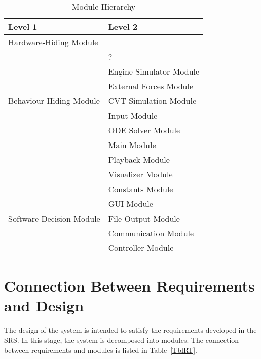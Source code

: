 \documentclass[12pt, titlepage]{article}
\begin{document}
\begin{table}[h!]
\centering
\begin{tabular}{p{} p{}}
\toprule
\textbf{Level 1} & \textbf{Level 2}\\
\midrule

{Hardware-Hiding Module} & ~ \\
\midrule

\multirow{7}{0.3\textwidth}{Behaviour-Hiding Module} & ?\\
& Engine Simulator Module\\
& External Forces Module\\
& CVT Simulation Module\\
& Input Module\\
& ODE Solver Module\\
& Main Module\\ 
& Playback Module\\
& Visualizer Module\\
& Constants Module\\
\midrule

\multirow{3}{0.3\textwidth}{Software Decision Module}
& GUI Module\\
& File Output Module\\
& Communication Module\\
& Controller Module\\
\bottomrule

\end{tabular}
\caption{Module Hierarchy}
\label{TblMH}
\end{table}

\section{Connection Between Requirements and Design} \label{SecConnection}

The design of the system is intended to satisfy the requirements developed in
the SRS. In this stage, the system is decomposed into modules. The connection
between requirements and modules is listed in Table~\ref{TblRT}.

\end{document}
